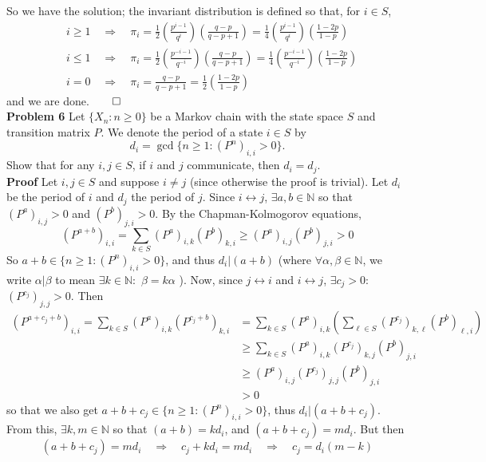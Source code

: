 \documentclass[11pt, letterpaper]{article}
\newcommand{\mbb}[1]{\mathbb{#1}}
\begin{document}
    So we have the solution; the invariant distribution is defined so that, for $i\in S$,
    \begin{align*}
        &i\geq 1\quad\Rightarrow\quad \pi_i=\frac{1}{2}\left(\frac{p^{i-1}}{q^i}\right)\left(\frac{q-p}{q-p+1}\right)=\frac{1}{4}\left(\frac{p^{i-1}}{q^i}\right)\left(\frac{1-2p}{1-p}\right)\\
        &i\leq 1\quad\Rightarrow\quad \pi_i=\frac{1}{2}\left(\frac{p^{-i-1}}{q^{-i}}\right)\left(\frac{q-p}{q-p+1}\right)=\frac{1}{4}\left(\frac{p^{-i-1}}{q^{-i}}\right)\left(\frac{1-2p}{1-p}\right)\\
        &i=0\quad\Rightarrow\quad\pi_i=\frac{q-p}{q-p+1}=\frac{1}{2}\left(\frac{1-2p}{1-p}\right)
    \end{align*}
    and we are done.\hfill{$\qed$}\\[10pt]
    {\bf Problem 6} Let $\{X_n:n\geq 0\}$ be a Markov chain with the state space $S$ and transition matrix $P$. We denote the period of a state $i\in S$ by
    \[d_i=\gcd\{n\geq 1:(P^n)_{i,i}>0\}.\]
    Show that for any $i,j\in S$, if $i$ and $j$ communicate, then $d_i=d_j$.\\[10pt]
    {\bf Proof} Let $i,j\in S$ and suppose $i\neq j$ (since otherwise the proof is trivial). Let $d_i$ be the period of $i$ and $d_j$ the period of $j$. Since $i\longleftrightarrow j$, $\exists a,b\in\mbb{N}$ so that
    $(P^{a})_{i,j}>0$ and $(P^{b})_{j,i}>0$. By the Chapman-Kolmogorov equations,
    \[(P^{a+b})_{i,i}=\sum_{k\in S}(P^{a})_{i,k}(P^{b})_{k,i}\geq (P^{a})_{i,j}(P^{b})_{j,i}>0\]
    So $a+b\in\{n\geq 1:(P^n)_{i,i}>0\}$, and thus $d_i|(a+b)$ (where $\forall \alpha,\beta\in\mbb{N}$, we write $\alpha|\beta$ to mean $\exists k\in\mbb{N}:$ $\beta=k\alpha$ ).
    Now, since $j\longleftrightarrow i$ and $i\longleftrightarrow j$, $\exists {c_j}>0:$ $(P^{c_j})_{j,j}>0$. Then
    \begin{align*}
        (P^{a+c_j+b})_{i,i}=\sum_{k\in S}(P^a)_{i,k}(P^{c_j+b})_{k,i}&=\sum_{k\in S}(P^a)_{i,k}\left(\sum_{\ell\in S}(P^{c_j})_{k,\ell}(P^{b})_{\ell, i}\right)\\
        &\geq\sum_{k\in S}(P^a)_{i,k}(P^{c_j})_{k,j}(P^b)_{j,i}\\
        &\geq (P^a)_{i,j}(P^{c_j})_{j,j}(P^b)_{j,i}\\
        &>0
    \end{align*}
    so that we also get $a+b+{c_j}\in\{n\geq 1:(P^n)_{i,i}>0\}$, thus $d_i|(a+b+{c_j})$. From this, $\exists k,m\in\mbb{N}$ so that $(a+b)=kd_i$, and $(a+b+{c_j})=md_i$. But then
    \[(a+b+{c_j})=md_i\quad\Rightarrow\quad {c_j}+kd_i=md_i\quad\Rightarrow\quad {c_j}=d_i(m-k)\]
\end{document}
